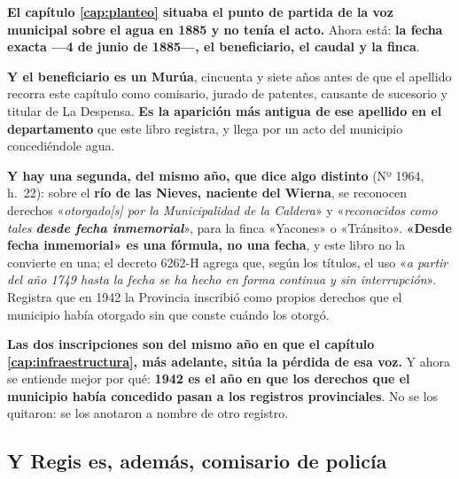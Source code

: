 \begin{cautela}
\textbf{El capítulo \ref{cap:planteo} situaba el punto de partida de la voz
municipal sobre el agua en 1885 y no tenía el acto.} Ahora está: \textbf{la
fecha exacta ---4 de junio de 1885---, el beneficiario, el caudal y la finca}.

\textbf{Y el beneficiario es un Murúa}, cincuenta y siete años antes de que el
apellido recorra este capítulo como comisario, jurado de patentes, causante de
sucesorio y titular de La Despensa. \textbf{Es la aparición más antigua de ese
apellido en el departamento} que este libro registra, y llega por un acto del
municipio concediéndole agua.

\textbf{Y hay una segunda, del mismo año, que dice algo distinto} (Nº 1964,
h.\ 22): sobre el \textbf{río de las Nieves, naciente del Wierna}, se reconocen
derechos «\textit{otorgado[s] por la Municipalidad de la Caldera}» y
«\textit{reconocidos como tales \textbf{desde fecha inmemorial}}», para la finca
«Yacones» o «Tránsito». \textbf{«Desde fecha inmemorial» es una fórmula, no una
fecha}, y este libro no la convierte en una; el decreto 6262-H agrega que, según los
títulos, el uso «\textit{a partir del año 1749 hasta la fecha se ha hecho en forma
continua y sin interrupción}». Registra que en 1942 la Provincia inscribió como
propios derechos que el municipio había otorgado sin que conste cuándo los otorgó.

\textbf{Las dos inscripciones son del mismo año en que el capítulo
\ref{cap:infraestructura}, más adelante, sitúa la pérdida de esa voz.} Y ahora se entiende
mejor por qué: \textbf{1942 es el año en que los derechos que el municipio había
concedido pasan a los registros provinciales}. No se los quitaron: se los
anotaron a nombre de otro registro.
\end{cautela}

\subsection*{Y Regis es, además, comisario de policía}

